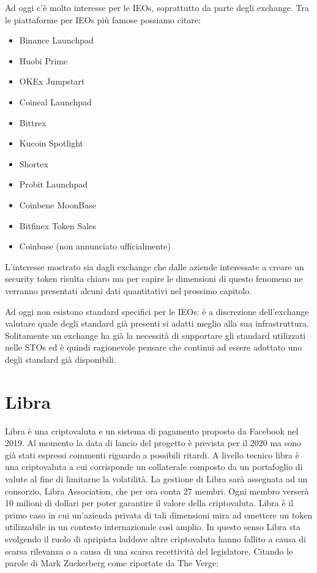 Ad oggi c'è molto interesse per le IEOs, soprattutto da parte degli exchange. Tra le piattaforme per IEOs più famose possiamo citare:
\begin{itemize}
    \item Binance Launchpad
    \item Huobi Prime
    \item OKEx Jumpstart
    \item Coineal Launchpad 
    \item Bittrex
    \item Kucoin Spotlight
    \item Shortex 
    \item Probit Launchpad 
    \item Coinbene MoonBase
    \item Bitfinex Token Sales
    \item Coinbase (non annunciato ufficialmente) 
\end{itemize}
L'interesse mostrato sia dagli exchange che dalle aziende interessate a creare un security token risulta chiaro ma per capire le dimensioni di questo fenomeno ne verranno presentati alcuni dati quantitativi nel prossimo capitolo.

Ad oggi non esistono standard specifici per le IEOs: è a discrezione dell'exchange valutare quale degli standard già presenti si adatti meglio alla sua infrastruttura. Solitamente un exchange ha già la necessità di supportare gli standard utilizzati nelle STOs ed è quindi ragionevole pensare che continui ad essere adottato uno degli standard già disponibili. 

\section{Libra}
Libra è una criptovaluta e un sistema di pagamento proposto da Facebook nel 2019. Al momento la data di lancio del progetto è prevista per il 2020 ma sono già stati espressi commenti riguardo a possibili ritardi. 
A livello tecnico libra è una criptovaluta a cui corrisponde un collaterale composto da un portafoglio di valute al fine di limitarne la volatilità. La gestione di Libra sarà assegnata ad un consorzio, Libra Association, che per ora conta 27 membri. Ogni membro verserà 10 milioni di dollari per poter garantire il valore della criptovaluta. 
Libra è il primo caso in cui un'azienda privata di tali dimensioni mira ad emettere un token utilizzabile in un contesto internazionale così amplio. In questo senso Libra sta svolgendo il ruolo di apripista laddove altre criptovaluta hanno fallito a causa di scarsa rilevanza o a causa di una scarsa recettività del legislatore. Citando le parole di Mark Zuckerberg come riportate da The Verge: 

